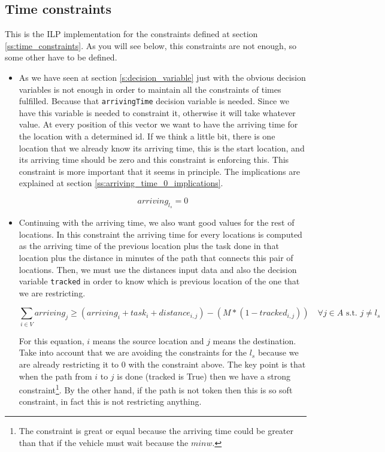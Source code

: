 \documentclass[]{report}
\begin{document}
\subsection{Time constraints}

This is the ILP implementation for the constraints defined at section \ref{ss:time_constraints}. As you will see below, this constraints are not enough, so some other have to be defined.

\begin{itemize}
	\item As we have seen at section \ref{s:decision_variable} just with the obvious decision variables is not enough in order to maintain all the constraints of times fulfilled. Because that {\tt arrivingTime} decision variable is needed. Since we have this variable is needed to constraint it, otherwise it will take whatever value. At every position of this vector we want to have the arriving time for the location with a determined id. If we think a little bit, there is one location that we already know its arriving time, this is the start location, and its arriving time should be zero and this constraint is enforcing this. This constraint is more important that it seems in principle. The implications are explained at section \ref{ss:arriving_time_0_implications}.
	
	$$ arriving_{l_{s}} = 0 $$

	\item Continuing with the arriving time, we also want good values for the rest of locations. In this constraint the arriving time for every locations is computed as the arriving time of the previous location plus the task done in that location plus the distance in minutes of the path that connects this pair of locations. Then, we must use the distances input data and also the decision variable {\tt tracked} in order to know which is previous location of the one that we are restricting.
	
	$$ \sum\limits_{i \in V} arriving_{j} \geq (arriving_i + task_i + distance_{i, j}) - (M*(1-tracked_{i, j})) \quad \forall j \in A \text{ s.t. } j \neq l_{s}$$
		
	For this equation, $i$ means the source location and $j$ means the destination. Take into account that we are avoiding the constraints for the $l_{s}$ because we are already restricting it to $0$ with the constraint above.
	The key point is that when the path from $i$ to $j$ is done (tracked is True) then we have a strong constraint\footnote{The constraint is great or equal because the arriving time could be greater than that if the vehicle must wait because the $minw$.}. By the other hand, if the path is not token then this is so soft constraint, in fact this is not restricting anything.
	

\end{itemize}
\end{document}
